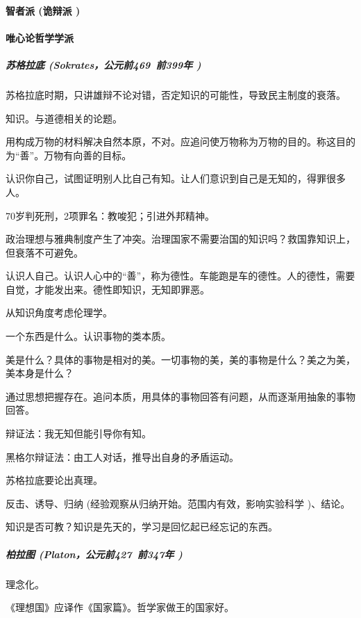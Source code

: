 \documentclass[UTF8]{../RepresentationUniverse}
\begin{document}
        \paragraph{智者派 (诡辩派 )}
        \paragraph{唯心论哲学学派}
            \subparagraph{苏格拉底 (Sokrates，公元前469~前399年 )}
            苏格拉底时期，只讲雄辩不论对错，否定知识的可能性，导致民主制度的衰落。

            知识。与道德相关的论题。
    
            用构成万物的材料解决自然本原，不对。应追问使万物称为万物的目的。称这目的为“善”。万物有向善的目标。
    
            认识你自己，试图证明别人比自己有知。让人们意识到自己是无知的，得罪很多人。
    
            70岁判死刑，2项罪名：教唆犯；引进外邦精神。
    
            政治理想与雅典制度产生了冲突。治理国家不需要治国的知识吗？救国靠知识上，但衰落不可避免。
    
            认识人自己。认识人心中的“善”，称为德性。车能跑是车的德性。人的德性，需要自觉，才能发出来。德性即知识，无知即罪恶。
    
            从知识角度考虑伦理学。
    
            一个东西是什么。认识事物的类本质。
    
            美是什么？具体的事物是相对的美。一切事物的美，美的事物是什么？美之为美，美本身是什么？
    
            通过思想把握存在。追问本质，用具体的事物回答有问题，从而逐渐用抽象的事物回答。
    
            辩证法：我无知但能引导你有知。
    
            黑格尔辩证法：由工人对话，推导出自身的矛盾运动。
    
            苏格拉底要论出真理。
    
            反击、诱导、归纳 (经验观察从归纳开始。范围内有效，影响实验科学 )、结论。
    
            知识是否可教？知识是先天的，学习是回忆起已经忘记的东西。


            \subparagraph{柏拉图 (Platon，公元前427~前347年 )}

            理念化。

            《理想国》应译作《国家篇》。哲学家做王的国家好。
    
\end{document}
